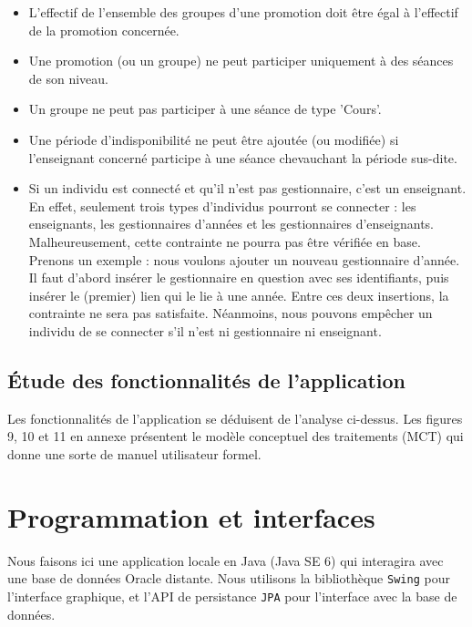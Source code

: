 \documentclass{article}
\begin{document}
\begin{itemize}
\item L'effectif de l'ensemble des groupes d'une promotion doit être égal à l'effectif de la promotion concernée.

\item Une promotion (ou un groupe) ne peut participer uniquement à des séances de son niveau.

\item Un groupe ne peut pas participer à une séance de type 'Cours'.

\item Une période d'indisponibilité ne peut être ajoutée (ou modifiée) si l'enseignant concerné participe à une séance chevauchant la période sus-dite.

\item Si un individu est connecté et qu'il n'est pas gestionnaire, c'est un enseignant. En effet, seulement trois types d'individus pourront se connecter : les enseignants, les gestionnaires d'années et les gestionnaires d'enseignants. Malheureusement, cette contrainte ne pourra pas être vérifiée en base. Prenons un exemple : nous voulons ajouter un nouveau gestionnaire d'année. Il faut d'abord insérer le gestionnaire en question avec ses identifiants, puis insérer le (premier) lien qui le lie à une année. Entre ces deux insertions, la contrainte ne sera pas satisfaite. Néanmoins, nous pouvons empêcher un individu de se connecter s'il n'est ni gestionnaire ni enseignant.

\end{itemize}

\subsection{\'Etude des fonctionnalités de l'application}
Les fonctionnalités de l'application se déduisent de l'analyse ci-dessus. Les figures 9, 10 et 11 en annexe présentent le modèle conceptuel des traitements (MCT) qui donne une sorte de manuel utilisateur formel.


\newpage
\section{Programmation et interfaces}

Nous faisons ici une application locale en Java (Java SE 6) qui interagira avec une base de données Oracle distante. Nous utilisons la bibliothèque \texttt{Swing} pour l'interface graphique, et l'API de persistance \texttt{JPA} pour l'interface avec la base de données.
\end{document}
